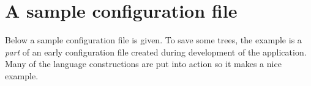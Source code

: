 
\chapter{A sample configuration file} \label{chapt:samplespock}

Below a sample configuration file is given. To save some trees, the example is
a \emph{part} of an early configuration file created during development of the
application. Many of the language constructions are put into action so it makes
a nice example.

\begin{alltt}
\tiny

\end{alltt}
